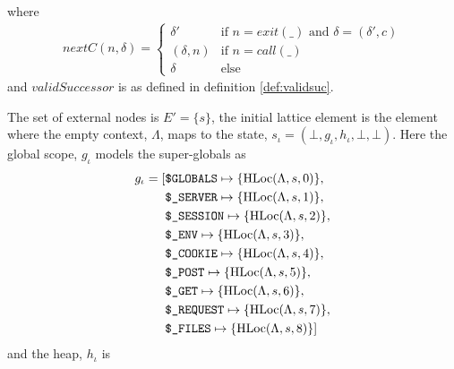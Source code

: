 where 
\begin{align}
\mathit{nextC}(n,\delta) = 
	\begin{cases}
		\delta' & \text{if $n = \mathit{exit(\_)}$ and $\delta = (\delta', c)$}\\
		(\delta, n) &\text{if }n=\mathit{call}(\_)\\
		\delta &\text{else} 
	\end{cases}
\end{align} and $\mathit{validSuccessor}$ is as defined in definition \ref{def:validsuc}. 

The set of external nodes is $E' = \{s\}$, the initial lattice element is the element where the empty context, $\Lambda$, maps to the state, $s_\iota = (\bot, g_\iota, h_\iota, \bot, \bot)$. Here the global scope, $g_\iota$ models the super-globals as
\begin{align*}
g_\iota = 	[&\texttt{\$GLOBALS}\mapsto \{\text{HLoc}(\Lambda, s, 0)\},\notag\\
			 &\texttt{\$\_SERVER}\mapsto \{\text{HLoc}(\Lambda, s, 1)\},\notag\\
			 &\texttt{\$\_SESSION}\mapsto \{\text{HLoc}(\Lambda, s, 2)\},\notag\\
			 &\texttt{\$\_ENV}\mapsto \{\text{HLoc}(\Lambda, s, 3)\},\notag\\
			 &\texttt{\$\_COOKIE}\mapsto \{\text{HLoc}(\Lambda, s, 4)\},\notag\\
			 &\texttt{\$\_POST}\mapsto \{\text{HLoc}(\Lambda, s, 5)\},\notag\\
			 &\texttt{\$\_GET}\mapsto \{\text{HLoc}(\Lambda, s, 6)\},\notag\\
			 &\texttt{\$\_REQUEST}\mapsto \{\text{HLoc}(\Lambda, s, 7)\}, \notag\\
			 &\texttt{\$\_FILES}\mapsto \{\text{HLoc}(\Lambda, s, 8)\}]
\end{align*} 
and the heap, $h_\iota$ is
